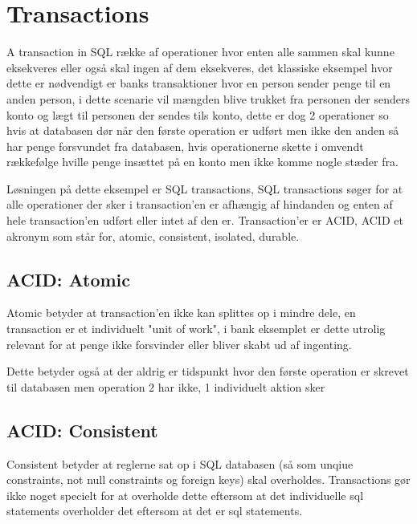 \section{Transactions}\label{sec:transactions}
A transaction in SQL række af operationer hvor enten alle sammen skal kunne eksekveres eller også skal ingen af dem eksekveres, det klassiske eksempel hvor dette er nødvendigt er banks transaktioner hvor en person sender penge til en anden person, i dette scenarie vil mængden blive trukket fra personen der senders konto og lægt til personen der sendes tils konto, dette er dog 2 operationer so hvis at databasen dør når den første operation er udført men ikke den anden så har penge forsvundet fra databasen, hvis operationerne skette i omvendt rækkefølge hville penge insættet på en konto men ikke komme nogle stæder fra. 

Løsningen på dette eksempel er SQL transactions, SQL transactions søger for at alle operationer der sker i transaction'en er afhængig af hindanden og enten af hele transaction'en udført eller intet af den er. Transaction'er er ACID, ACID et akronym som står for, atomic, consistent, isolated, durable.

\subsection{ACID: Atomic}\label{sec:acidAtomic}
Atomic betyder at transaction'en ikke kan splittes op i mindre dele, en transaction er et individuelt "unit of work", i bank eksemplet er dette utrolig relevant for at penge ikke forsvinder eller bliver skabt ud af ingenting. 

Dette betyder også at der aldrig er tidspunkt hvor den første operation er skrevet til databasen men operation 2 har ikke, 1 individuelt aktion sker

\subsection{ACID: Consistent}\label{sec:acidConsistent}
Consistent betyder at reglerne sat op i SQL databasen (så som unqiue constraints, not null constraints og foreign keys) skal overholdes. Transactions gør ikke noget specielt for at overholde dette eftersom at det individuelle sql statements overholder det eftersom at det er sql statements.

